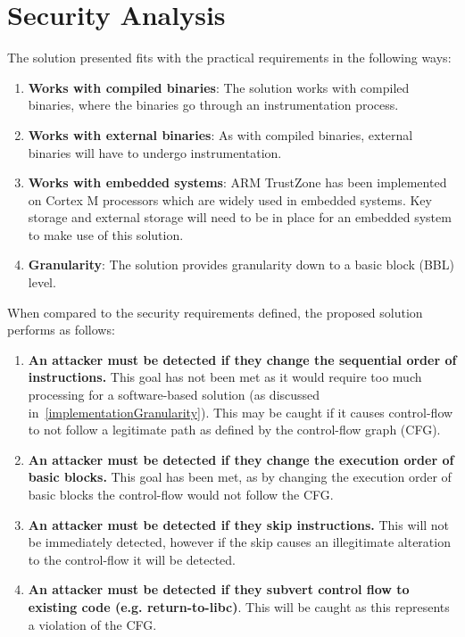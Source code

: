 \section{Security Analysis}

The solution presented fits with the practical requirements in the following ways:
\begin{enumerate}
	\item \textbf{Works with compiled binaries}: The solution works with compiled binaries, where the binaries go through an instrumentation process.
	\item \textbf{Works with external binaries}: As with compiled binaries, external binaries will have to undergo instrumentation.
	\item \textbf{Works with embedded systems}: ARM TrustZone has been implemented on Cortex M processors which are widely used in embedded systems. Key storage and external storage will need to be in place for an embedded system to make use of this solution.
	\item \textbf{Granularity}: The solution provides granularity down to a basic block (BBL) level.
\end{enumerate}

When compared to the security requirements defined, the proposed solution performs as follows:
\begin{enumerate}
	\item \textbf{An attacker must be detected if they change the sequential order of instructions.} This goal has not been met as it would require too much processing for a software-based solution (as discussed in~\ref{implementationGranularity}). This may be caught if it causes control-flow to not follow a legitimate path as defined by the control-flow graph (CFG).
	\item \textbf{An attacker must be detected if they change the execution order of basic blocks.} This goal has been met, as by changing the execution order of basic blocks the control-flow would not follow the CFG.
	\item \textbf{An attacker must be detected if they skip instructions.} This will not be immediately detected, however if the skip causes an illegitimate alteration to the control-flow it will be detected.
	\item \textbf{An attacker must be detected if they subvert control flow to existing code (e.g. return-to-libc)}. This will be caught as this represents a violation of the CFG.
\end{enumerate}

